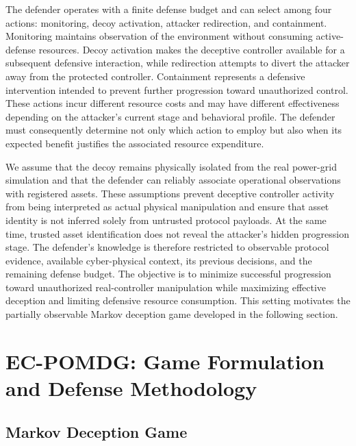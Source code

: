 \documentclass[10pt,conference]{IEEEtran}
\begin{document}
The defender operates with a finite defense budget and can select among four actions: monitoring, decoy activation, attacker redirection, and containment. Monitoring maintains observation of the environment without consuming active-defense resources. Decoy activation makes the deceptive controller available for a subsequent defensive interaction, while redirection attempts to divert the attacker away from the protected controller. Containment represents a defensive intervention intended to prevent further progression toward unauthorized control. These actions incur different resource costs and may have different effectiveness depending on the attacker's current stage and behavioral profile. The defender must consequently determine not only which action to employ but also when its expected benefit justifies the associated resource expenditure.

We assume that the decoy remains physically isolated from the real power-grid simulation and that the defender can reliably associate operational observations with registered assets. These assumptions prevent deceptive controller activity from being interpreted as actual physical manipulation and ensure that asset identity is not inferred solely from untrusted protocol payloads. At the same time, trusted asset identification does not reveal the attacker's hidden progression stage. The defender's knowledge is therefore restricted to observable protocol evidence, available cyber-physical context, its previous decisions, and the remaining defense budget. The objective is to minimize successful progression toward unauthorized real-controller manipulation while maximizing effective deception and limiting defensive resource consumption. This setting motivates the partially observable Markov deception game developed in the following section.


\section{EC-POMDG: Game Formulation and Defense Methodology}
\label{sec:methodology}


\subsection{Markov Deception Game}
\end{document}
